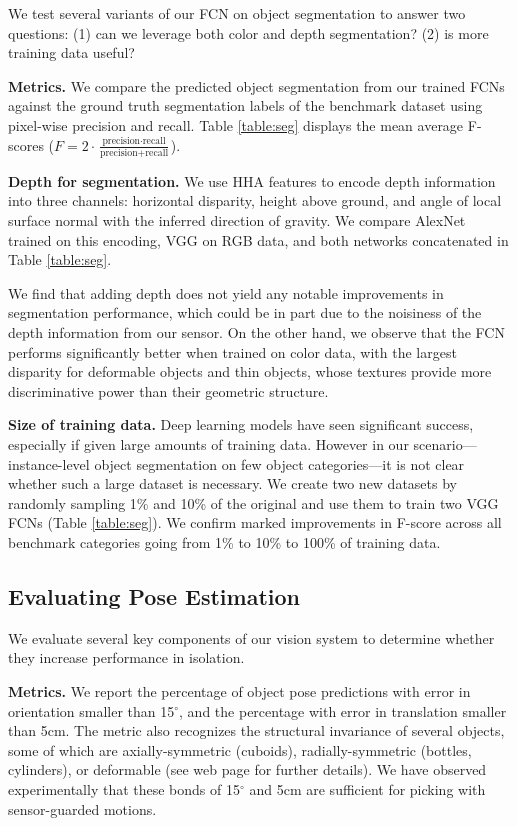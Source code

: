 \documentclass[letterpaper, 10 pt, conference]{ieeeconf}  %
\newcommand{\myparagraph}[1]{\vspace{0.1in}\noindent\textbf{#1}}
\begin{document}
We test several variants of our FCN on object segmentation to answer two questions: (1) can we leverage both color and depth segmentation? (2) is more training data useful? 


\myparagraph{Metrics.} We compare the predicted object segmentation from our trained FCNs against the ground truth segmentation labels of the benchmark dataset using pixel-wise precision and recall. Table \ref{table:seg} displays the mean average F-scores ($F=2\cdot\frac{\text{precision}\cdot\text{recall}}{\text{precision}+\text{recall}}$).


\myparagraph{Depth for segmentation.} We use HHA features \cite{gupta2014learning} to encode depth information into three channels: horizontal disparity, height above ground, and angle of local surface normal with the inferred direction of gravity. We compare AlexNet trained on this encoding, VGG on RGB data, and both networks concatenated in Table \ref{table:seg}.

We find that adding depth does not yield any notable improvements in segmentation performance, which could be in part due to the noisiness of the depth information from our sensor. On the other hand, we observe that the FCN performs significantly better when trained on color data, with the largest disparity for deformable objects and thin objects, whose textures provide more discriminative power than their geometric structure.

\myparagraph{Size of training data.} Deep learning models have seen significant success, especially if given large amounts of training data. However in our scenario---instance-level object segmentation on few object categories---it is not clear whether such a large dataset is necessary. We create two new datasets by randomly sampling 1\% and 10\% of the original and use them to train two VGG FCNs (Table \ref{table:seg}). We confirm marked improvements in F-score across all benchmark categories going from 1\% to 10\% to 100\% of training data.




\subsection{Evaluating Pose Estimation}

We evaluate several key components of our vision system to determine whether they increase performance in isolation.


\myparagraph{Metrics.} We report the percentage of object pose predictions with error in orientation smaller than 15$^{\circ}$, and the percentage with error in translation smaller than 5cm. The metric also recognizes the structural invariance of several objects, some of which are axially-symmetric (cuboids), radially-symmetric (bottles, cylinders), or deformable (see web page \cite{projectwebsite} for further details). We have observed experimentally that these bonds of 15$^{\circ}$ and 5cm are sufficient for picking with sensor-guarded motions.
\end{document}
